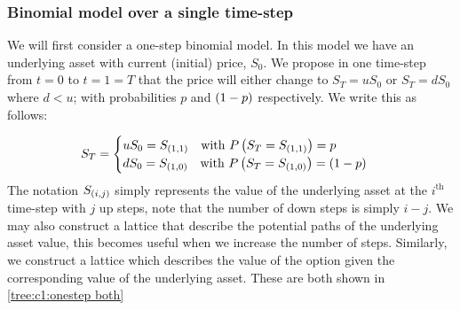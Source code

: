 \subsubsection{Binomial model over a single time-step}

We will first consider a one-step binomial model. In this model we have an underlying asset with current (initial) price, \(S_0\). We propose in one time-step from \(t = 0\) to \(t = 1 = T\) that the price will either change to \(S_T = uS_0\) or \(S_T = dS_0\) where \(d < u\); with probabilities \(p\) and \(\left(1-p\right)\) respectively. We write this as follows:

\begin{align*}
    S_T 
    =
    \begin{cases}
        uS_0 = S_{\left(1,1\right)} \quad \text{with }P\left(S_T=S_{\left(1,1\right)}\right) = p \\
        dS_0 = S_{\left(1,0\right)} \quad \text{with }P\left(S_T=S_{\left(1,0\right)}\right) = \left(1-p\right)
    \end{cases}
\end{align*}
The notation \(S_{\left(i,j\right)}\) simply represents the value of the underlying asset at the \(i^\text{th}\) time-step with \(j\) up steps, note that the number of down steps is simply \(i-j\).
\nline{}
We may also construct a lattice that describe the potential paths of the underlying asset value, this becomes useful when we increase the number of steps. Similarly, we construct a lattice which describes the value of the option given the corresponding value of the underlying asset. These are both shown in \autoref{tree:c1:onestep both}

